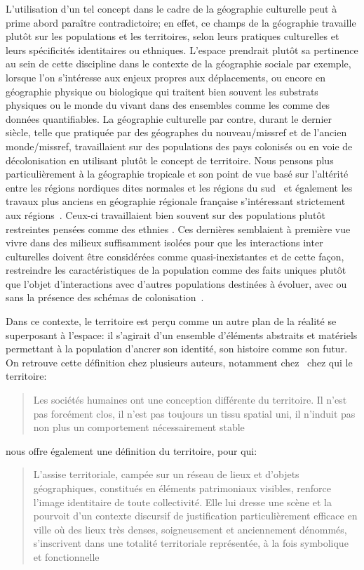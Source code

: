 L'utilisation d'un tel concept dans le cadre de la géographie culturelle peut à prime abord paraître contradictoire; en effet, ce champs de la géographie travaille plutôt sur les populations et les territoires, selon leurs pratiques culturelles et leurs spécificités identitaires ou ethniques. 
L'espace prendrait plutôt sa pertinence au sein de cette discipline dans le contexte de la géographie sociale par exemple, lorsque l'on s'intéresse aux enjeux propres aux déplacements, ou encore en géographie physique ou biologique qui traitent bien souvent les substrats physiques ou le monde du vivant dans des ensembles comme les  comme des données quantifiables. 
La géographie culturelle par contre, durant le dernier siècle, telle que pratiquée par des géographes du nouveau/missref et de l'ancien monde/missref, travaillaient sur des populations des pays colonisés ou en voie de décolonisation en utilisant plutôt le concept de territoire. 
Nous pensons plus particulièrement à la géographie tropicale et son point de vue basé sur l'altérité entre les régions nordiques dites normales et les régions du sud~\citep[493]{Power2009} et également les travaux plus anciens en géographie régionale française s'intéressant strictement aux régions~\citep[31]{Courville1991}. 
Ceux-ci travaillaient bien souvent sur des populations plutôt restreintes pensées comme des ethnies .
Ces dernières semblaient à première vue vivre dans des milieux suffisamment isolées pour que les interactions inter culturelles doivent être considérées comme quasi-inexistantes et de cette façon, restreindre les caractéristiques de la population comme des faits uniques plutôt que l'objet d'interactions avec d'autres populations destinées à évoluer, avec ou sans la présence des schémas de colonisation~\citep[79--80]{DiMeo2007}.

Dans ce contexte, le territoire est perçu comme un autre plan de la réalité se superposant à l'espace: il s'agirait d'un ensemble d'éléments abstraits et matériels permettant à la population d'ancrer son identité, son histoire comme son futur. 
On retrouve cette définition chez plusieurs auteurs, notamment chez~\citeauthor{Bonnemaison1981} chez qui le territoire:
\blockquote[{\cite[253]{Bonnemaison1981}}][.]{Les sociétés humaines ont une conception différente du territoire. Il n'est pas forcément clos, il n'est pas toujours un tissu spatial uni, il n'induit pas non plus un comportement nécessairement stable}. 
\citeauthor{DiMeo2007} nous offre également une définition du territoire, pour qui:
\blockquote[{\cite[76]{DiMeo2007}}][.]{L’assise territoriale, campée sur un réseau de lieux et d’objets géographiques, constitués en éléments patrimoniaux visibles, renforce l’image identitaire de toute collectivité. Elle lui dresse une scène et la pourvoit d’un contexte discursif de justification particulièrement efficace en ville où des lieux très denses, soigneusement et anciennement dénommés, s’inscrivent dans une totalité territoriale représentée, à la fois symbolique et fonctionnelle}. 


